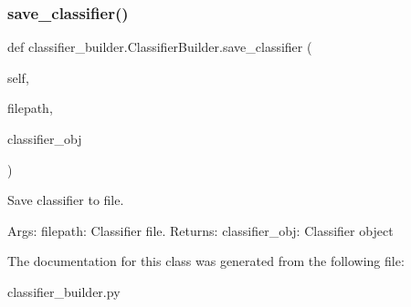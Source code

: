\subsubsection{\texorpdfstring{save\+\_\+classifier()}{save\_classifier()}}
{\footnotesize\ttfamily def classifier\+\_\+builder.\+Classifier\+Builder.\+save\+\_\+classifier (\begin{DoxyParamCaption}\item[{}]{self,  }\item[{}]{filepath,  }\item[{}]{classifier\+\_\+obj }\end{DoxyParamCaption})}



Save classifier to file. 

Args\+: filepath\+: Classifier file. Returns\+: classifier\+\_\+obj\+: Classifier object 

The documentation for this class was generated from the following file\+:\begin{DoxyCompactItemize}
\item 
classifier\+\_\+builder.\+py\end{DoxyCompactItemize}
